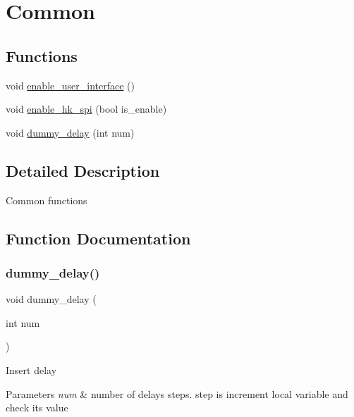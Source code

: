 \hypertarget{group__common}{}\section{Common}
\label{group__common}
\subsection*{Functions}
\begin{DoxyCompactItemize}
\item 
void \hyperlink{group__common_gaf79fbe355fd538621db12e3ae9e3e6b8}{enable\+\_\+user\+\_\+interface} ()
\item 
void \hyperlink{group__common_ga37a92e81df76732622207204976178f9}{enable\+\_\+hk\+\_\+spi} (bool is\+\_\+enable)
\item 
void \hyperlink{group__common_ga875e99bdc81b2f0c925af03d4881438c}{dummy\+\_\+delay} (int num)
\end{DoxyCompactItemize}


\subsection{Detailed Description}
Common functions 

\subsection{Function Documentation}
\mbox{\label{group__common_ga875e99bdc81b2f0c925af03d4881438c}} 
\subsubsection{\texorpdfstring{dummy\+\_\+delay()}{dummy\_delay()}}
{\footnotesize\ttfamily void dummy\+\_\+delay (\begin{DoxyParamCaption}\item[{int}]{num }\end{DoxyParamCaption})}

Insert delay


\begin{DoxyParams}{Parameters}
{\em num} & number of delays steps. step is increment local variable and check it\textquotesingle{}s value \\
\hline
\end{DoxyParams}
\mbox{\label{group__common_ga37a92e81df76732622207204976178f9}} 
